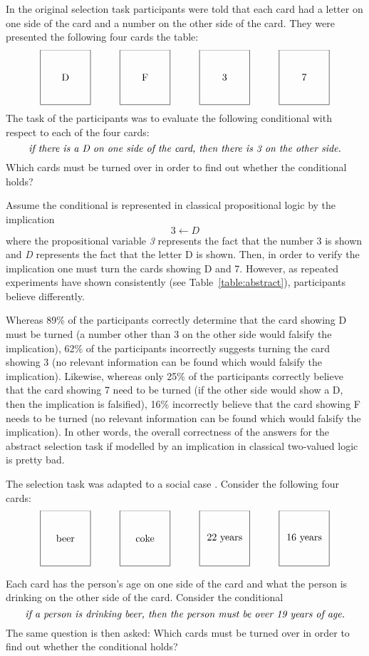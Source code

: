 In the original selection task \cite{wason1968reasoning} participants were told that each card had a letter on one side of the card and a number on the other side of the card. They were presented the following four cards the table:
\[
\framebox(50,55){D}  \quad\quad\quad \framebox(50,55){F}  \quad\quad\quad
\framebox(50,55){3}  \quad\quad\quad \framebox(50,55){7} 
\]
The task of the participants was to evaluate the following conditional with respect to each of the four cards:
\[
\mbox{\textit{if there is a D on one side of the card, then there is 3 on the other side.}}
\]
Which cards must be turned over in order to find out whether the conditional holds?

Assume the conditional is represented in classical propositional logic by the implication 
\[
3 \leftarrow D
\]
where the propositional variable \textit{3} represents the fact that the number 3 is shown and \textit{D} represents the fact that the letter D is shown. Then, in order to verify  the implication one must turn the cards showing D and 7. However, as repeated experiments have shown consistently (see Table~\ref{table:abstract}), participants believe differently. 

Whereas 89\% of the participants correctly determine that the card showing D must be turned (a number other than 3 on the other side would falsify the implication), 62\% of the participants incorrectly suggests turning the card showing 3 (no relevant information can be found which would falsify the implication). Likewise, whereas only 25\% of the participants correctly believe that the card showing 7 need to be turned (if the other side would show a D, then the implication is falsified), 16\% incorrectly believe that the card showing F needs to be turned (no relevant information can be found which would falsify the implication). In other words, the overall correctness of the answers for the abstract selection task if modelled by an implication in classical two-valued logic is pretty bad.

The selection task was adapted to a social case \cite{griggs1982elusive}. Consider the following four cards:
\[
\framebox(50,55){beer}  \quad\quad\quad \framebox(50,55){coke}  \quad\quad\quad 
\framebox(50,55){22 years} \quad\quad\quad  \framebox(50,55){16 years} 
\]

Each card has the person's age on one side of the card and what the person is drinking on the other side of the card. Consider the conditional
\[
\mbox{\textit{if a person is drinking beer, then the person must be over 19 years of age.}}
\]
The same question is then asked: Which cards must be turned over in order to find out whether the conditional holds?

